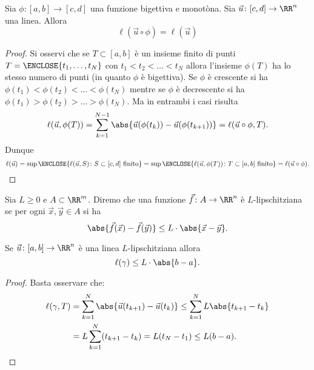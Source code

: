     \begin{theorem}[riparametrizzazione]
    Sia $\phi\colon [a,b] \to [c,d]$ una funzione bigettiva e monotòna.
    Sia $\vec u \colon [c,d]\to \RR^n$ una linea.
    Allora 
    \[
     \ell(\vec u \circ \phi) = \ell(\vec u)  
    \]
    \end{theorem}
    \begin{proof}
    Si osservi che se $T\subset [a,b]$ è un insieme 
    finito di punti $T=\ENCLOSE{t_1, \dots, t_N}$ con 
    $t_1 < t_2 < \dots < t_N$ allora 
    l'insieme $\phi(T)$ ha lo stesso numero di punti (in quanto 
    $\phi$ è bigettiva). 
    Se $\phi$ è crescente si ha 
    $\phi(t_1) < \phi(t_2) < \dots < \phi(t_N)$  
    mentre se $\phi$ è decrescente si ha 
    $\phi(t_1) > \phi(t_2) > \dots > \phi(t_N)$. 
    Ma in entrambi i casi risulta 
    \[
      \ell(\vec u, \phi(T)) 
      = \sum_{k=1}^{N-1} \abs{\vec u(\phi(t_k)) - \vec u(\phi(t_{k+1}))} 
      = \ell(\vec u \circ \phi, T).
    \]
    Dunque 
    \[
    \ell(\vec u) 
    = \sup\ENCLOSE{\ell(\vec u, S)\colon S\subset [c,d] \text{ finito}} 
    = \sup\ENCLOSE{\ell(\vec u,\phi(T))\colon T\subset [a,b] \text{ finito} }
    = \ell(\vec u\circ \phi).
    \]
    \end{proof}
    
    \begin{definition}
    Sia $L\ge 0$ e $A\subset \RR^m$.
    Diremo che una funzione $\vec f\colon A \to \RR^n$ 
    è $L$-lipschitziana se per ogni $\vec x, \vec y\in A$ si ha 
    \[
      \abs{\vec f(\vec x)-\vec f(\vec y)} \le L \cdot \abs{\vec x-\vec y}.  
    \]
    \end{definition}
    
    \begin{lemma}
      Se $\vec u \colon [a,b]\to \RR^n$ è una linea 
      $L$-lipschitziana allora 
      \[
       \ell(\gamma) \le L \cdot \abs{b-a}.  
      \]
    \end{lemma}
    \begin{proof} Basta osservare che:
      \begin{align*}
      \ell(\gamma, T) 
      &= \sum_{k=1}^N \abs{\vec u(t_{k+1})-\vec u(t_{k})}
      \le \sum_{k=1}^N L \abs{t_{k+1}-t_k} \\
      &= L \sum_{k=1}^N (t_{k+1} - t_k)
      = L (t_N-t_1) 
      \le L (b-a).
      \end{align*}
    \end{proof}
    
